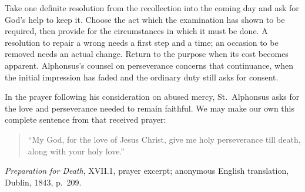 Take one definite resolution from the recollection into the coming day and ask for God's help to keep it. Choose the act which the examination has shown to be required, then provide for the circumstances in which it must be done. A resolution to repair a wrong needs a first step and a time; an occasion to be removed needs an actual change. Return to the purpose when its cost becomes apparent. Alphonsus's counsel on perseverance concerns that continuance, when the initial impression has faded and the ordinary duty still asks for consent.

In the prayer following his consideration on abused mercy, St.~Alphonsus asks for the love and perseverance needed to remain faithful. We may make our own this complete sentence from that received prayer:

\begin{quote}
``My God, for the love of Jesus Christ, give me holy perseverance till death, along with your holy love.''
\end{quote}

\noindent\emph{Preparation for Death}, XVII.1, prayer excerpt; anonymous English translation, Dublin, 1843, p.~209.

\clearpage
